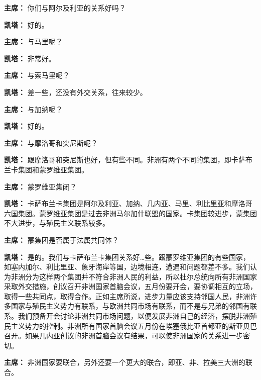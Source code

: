 \begin{duihua}
\item[\textbf{主席：}] 你们与阿尔及利亚的关系好吗？

\item[\textbf{凯塔：}] 好的。

\item[\textbf{主席：}] 与马里呢？

\item[\textbf{凯塔：}] 非常好。

\item[\textbf{主席：}] 与索马里呢？

\item[\textbf{凯塔：}] 差一些，还没有外交关系，往来较少。

\item[\textbf{主席：}] 与加纳呢？

\item[\textbf{凯塔：}] 好的。

\item[\textbf{主席：}] 与摩洛哥和突尼斯呢？

\item[\textbf{凯塔：}] 跟摩洛哥和突尼斯也好，但有些不同。非洲有两个不同的集团，即卡萨布兰卡集团和蒙罗维亚集团。

\item[\textbf{主席：}] 蒙罗维亚集闭？

\item[\textbf{凯塔：}] 卡萨布兰卡集团是阿尔及利亚、加纳、几内亚、马里、利比里亚和摩洛哥六国集团。蒙罗维亚集团是过去非洲马尔加什联盟的国家。卡集团较进步，蒙集团不大进步，与殖民主义联系较多。

\item[\textbf{主席：}] 蒙集团是否属于法属共同体？

\item[\textbf{凯塔：}] 是的。我们与卡萨布兰卡集团关系好…些。跟蒙罗维亚集团的有些国家，如塞内加尔、利比里亚、象牙海岸等国，边境相连，遭遇和问题都差不多。我们认为非洲分为这样两个集团并不符合非洲人民的利益，所以杜尔总统向所有非洲国家采取外交措施，创议召开非洲国家首脑会议，五月份要开会，要协调相互的立场，取得一些共同点，取得合作。正如主席所说，进步力量应该支持邻国人民，非洲许多国家与殖民主义势力有联系，与欧洲共同市场有联系，而不是与兄弟的邻国有联系。我们预备开会讨论非洲共同市场问题，以便发展非洲自己的经济，摆脱非洲殖民主义势力的控制。非洲所有国家首脑会议五月份在埃塞俄比亚首都亚的斯亚贝巴召开。如果几内亚创议的非洲首脑会议有结果，可以使非洲国家的关系进一步密切。

\item[\textbf{主席：}] 非洲国家要联合，另外还要一个更大的联合，即亚、非、拉美三大洲的联合。


\end{duihua}
